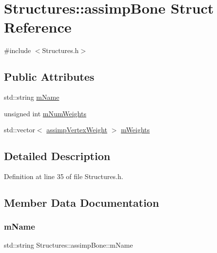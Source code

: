 \hypertarget{struct_structures_1_1assimp_bone}{}\section{Structures\+:\+:assimp\+Bone Struct Reference}
\label{struct_structures_1_1assimp_bone}


{\ttfamily \#include $<$Structures.\+h$>$}

\subsection*{Public Attributes}
\begin{DoxyCompactItemize}
\item 
std\+::string \mbox{\hyperlink{struct_structures_1_1assimp_bone_adce8c7f802266d92accb0b6d6fd9b680}{m\+Name}}
\item 
unsigned int \mbox{\hyperlink{struct_structures_1_1assimp_bone_ae16c31e3a38c9c33b7ea6215ceb41c23}{m\+Num\+Weights}}
\item 
std\+::vector$<$ \mbox{\hyperlink{struct_structures_1_1assimp_vertex_weight}{assimp\+Vertex\+Weight}} $>$ \mbox{\hyperlink{struct_structures_1_1assimp_bone_aba89fb8838ebfc69e0379773d0e6d7b7}{m\+Weights}}
\end{DoxyCompactItemize}


\subsection{Detailed Description}


Definition at line 35 of file Structures.\+h.



\subsection{Member Data Documentation}
\mbox{\label{struct_structures_1_1assimp_bone_adce8c7f802266d92accb0b6d6fd9b680}} 
\subsubsection{\texorpdfstring{m\+Name}{mName}}
{\footnotesize\ttfamily std\+::string Structures\+::assimp\+Bone\+::m\+Name}




